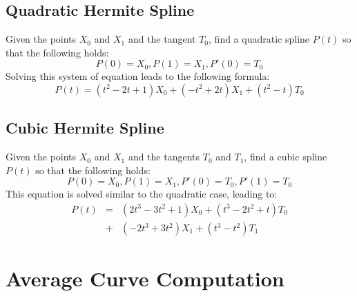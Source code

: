 \documentclass[journal, letterpaper]{IEEEtran}
\begin{document}
\subsection{Quadratic Hermite Spline}
Given the points $X_0$ and $X_1$ and the tangent $T_0$, find a quadratic spline $P(t)$ so that the following holds:
\begin{equation}
 P(0)=X_0, P(1)=X_1, P'(0)=T_0
\end{equation}
Solving this system of equation leads to the following formula:
\begin{equation}
 P(t) = (t^2-2t+1)X_0 + (-t^2+2t)X_1 + (t^2-t)T_0
\label{eq:QuadraticHermite}
\end{equation}

\subsection{Cubic Hermite Spline}
Given the points $X_0$ and $X_1$ and the tangents $T_0$ and $T_1$, find a cubic spline $P(t)$ so that the following holds:
\begin{equation}
 P(0)=X_0, P(1)=X_1, P'(0)=T_0, P'(1)=T_0
\end{equation}
This equation is solved similar to the quadratic case, leading to:
\begin{equation}
\begin{array}{rcl}
	P(t) &=& (2t^3-3t^2+1)X_0 + (t^3-2t^2+t)T_0 \\
	     &+& (-2t^3+3t^2)X_1 + (t^3-t^2)T_1
\end{array}
\label{eq:CubicHermite}
\end{equation}

\newpage
\section{Average Curve Computation}\label{chapter:Tracing}
\end{document}
